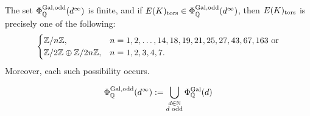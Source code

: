
\begin{frame}[plain]
\end{frame}



\begin{frame}[plain,c]
\begin{thm}[M.]
The set $\Phi_{\mathbb{Q}}^{\operatorname{Gal},\text{odd}}(d^\infty)$ is finite, and if $E(K)_{\text{tors}} \in \Phi_{\mathbb{Q}}^{\operatorname{Gal},\text{odd}}(d^\infty)$, then $E(K)_{\text{tors}}$ is precisely one of the following:
	\[
	\begin{cases}
	\mathbb{Z}/n\mathbb{Z}, & n= 1, 2, \ldots, 14, 18, 19, 21, 25, 27, 43, 67, 163 \text{ or} \\
	\mathbb{Z}/2\mathbb{Z} \oplus \mathbb{Z}/2n\mathbb{Z}, & n= 1, 2, 3, 4, 7.
	\end{cases}
	\]
Moreover, each such possibility occurs. 
\end{thm}
	\[
	\Phi_{\mathbb{Q}}^{\operatorname{Gal},\text{odd}}(d^\infty):= \bigcup_{\substack{d \in \mathbb{N} \\ d \text{ odd}}} \Phi_{\mathbb{Q}}^{\operatorname{Gal}}(d)
	\]
\end{frame}



